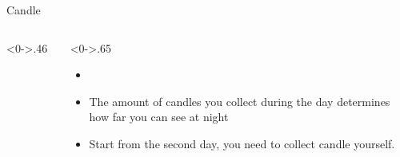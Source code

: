 \documentclass[notheorems]{beamer}
\begin{document}
\begin{framenl}{Candle}
\begin{columns}[T]
\begin{column}<0->{.46\textwidth}
\begin{figure}[thpb]
\centering
{}

\end{figure}
\end{column}
\hfill
\begin{column}<0->{.65\textwidth}
\begin{itemize}
\item []
\item<1-> The amount of candles you collect during the day determines how far you can see at night
\item<2-> Start from the second day, you need to collect candle yourself.
\end{itemize}
\end{column}
\end{columns}
\end{framenl}
\end{document}

